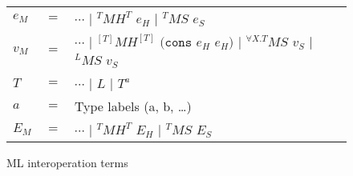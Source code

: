 \begin{figure}[p]
\label{mit}
\caption{ML interoperation terms}
\begin{center}
\begin{tabular}{lcl}
$e_{M}$ & $=$ & $\cdots$ $\vert$ $^{T}MH^{T}$ $e_{H}$ $\vert$ $^{T}MS$ $e_{S}$ \\
$v_{M}$ & $=$ & $\cdots$ $\vert$ $^{[T]}MH^{[T]}$ $(\mathtt{cons}$ $e_{H}$ $e_{H})$ $\vert$ $^{\forall X.T}MS$ $v_{S}$ $\vert$ $^{L}MS$ $v_{S}$ \\
$T$ & $=$ & $\cdots$ $\vert$ $L$ $\vert$ $T^{a}$ \\
$a$ & $=$ & Type labels (a, b, \ldots) \\
$E_{M}$ & $=$ & $\cdots$ $\vert$ $^{T}MH^{T}$ $E_{H}$ $\vert$ $^{T}MS$ $E_{S}$
\end{tabular}
\end{center}
\end{figure}